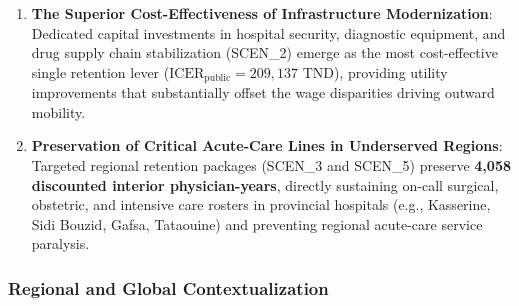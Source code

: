 \documentclass[
  11pt,
  a4paper]{article}
\begin{document}
\begin{enumerate}
  Although remuneration dissatisfaction is cited by \textgreater90\% of
  young Tunisian doctors (), an isolated salary increase (SCEN\_1: +30\% real base
  wage) requires 1,332.4 Million TND due to mandatory inframarginal
  public wage bill expansion across all 5,000+ public physicians. This
  results in an \(\text{ICER}_{\text{public}}\) of \textbf{509,451 TND}
  per public physician-year retained, making salary-only reform
  extendedly dominated.
\item
  \textbf{The Superior Cost-Effectiveness of Infrastructure
  Modernization}: Dedicated capital investments in hospital security,
  diagnostic equipment, and drug supply chain stabilization (SCEN\_2)
  emerge as the most cost-effective single retention lever
  (\(\text{ICER}_{\text{public}} = 209,137\text{ TND}\)), providing
  utility improvements that substantially offset the wage disparities
  driving outward mobility.
\item
  \textbf{Preservation of Critical Acute-Care Lines in Underserved
  Regions}: Targeted regional retention packages (SCEN\_3 and SCEN\_5)
  preserve \textbf{4,058 discounted interior physician-years}, directly
  sustaining on-call surgical, obstetric, and intensive care rosters in
  provincial hospitals (e.g., Kasserine, Sidi Bouzid, Gafsa, Tataouine)
  and preventing regional acute-care service paralysis.
\end{enumerate}

\subsubsection{Regional and Global
Contextualization}\label{regional-and-global-contextualization}
\end{document}
